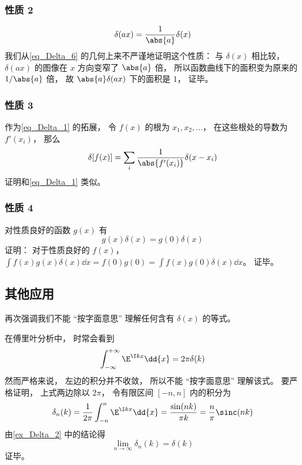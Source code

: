 \subsubsection{性质 2}
\begin{equation}\label{eq_Delta_1}
\delta(ax) = \frac{1}{\abs{a}} \delta(x)
\end{equation}
我们从\autoref{eq_Delta_6} 的几何上来不严谨地证明这个性质： 与 $\delta(x)$ 相比较， $\delta(ax)$ 的图像在 $x$ 方向变窄了 $\abs{a}$ 倍， 所以函数曲线下的面积变为原来的 $1/\abs{a}$ 倍， 故 $\abs{a}\delta(ax)$ 下的面积是 $1$， 证毕。

\subsubsection{性质 3}
作为\autoref{eq_Delta_1} 的拓展， 令 $f(x)$ 的根为 $x_1, x_2, \dots$， 在这些根处的导数为 $f'(x_i)$， 那么
\begin{equation}\label{eq_Delta_12}
\delta[f(x)] = \sum_i \frac{1}{\abs{f'(x_i)}} \delta(x - x_i)
\end{equation}
证明和\autoref{eq_Delta_1} 类似。

\subsubsection{性质 4}
对性质良好的函数 $g(x)$ 有
\begin{equation}
g(x)\delta(x) = g(0)\delta(x)
\end{equation}
证明： 对于性质良好的 $f(x)$， $\int f(x) g(x)\delta(x) \dd{x} = f(0)g(0) = \int f(x)g(0)\delta(x) \dd{x}$。 证毕。

\subsection{其他应用}
再次强调我们不能 “按字面意思” 理解任何含有 $\delta(x)$ 的等式。
\begin{example}{}\label{ex_Delta_1}
在傅里叶分析中， 时常会看到
\begin{equation}\label{eq_Delta_8}
\int_{-\infty}^{+\infty} \E^{\I kx}\dd{x} = 2\pi \delta(k)
\end{equation}
然而严格来说， 左边的积分并不收敛， 所以不能 “按字面意思” 理解该式。 要严格证明， 上式两边除以 $2\pi$， 令有限区间 $[-n,n]$ 内的积分为
\begin{equation}
\delta_n(k) = \frac{1}{2\pi}\int_{-n}^{n} \E^{\I kx}\dd{x} = \frac{\sin(n k)}{\pi k} = \frac{n}{\pi} \sinc(n k)
\end{equation}
由\autoref{ex_Delta_2} 中的结论得
\begin{equation}
\lim_{n\to\infty} \delta_n(k) = \delta(k)
\end{equation}
证毕。
\end{example}

